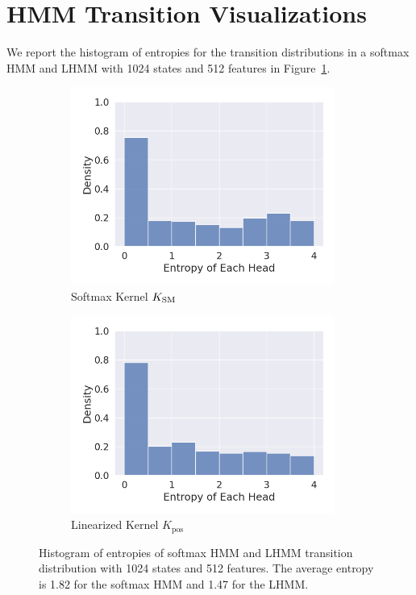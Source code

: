 \documentclass{article}
\begin{document}
\section{HMM Transition Visualizations}
We report the histogram of entropies for the transition distributions in a softmax HMM and LHMM with 1024 states and 512 features in Figure~\ref{fig:hmm_transition_histogram}.


\begin{figure}[!htp]
  \centering
  \begin{subfigure}[t]{0.45\textwidth}
  \centering
  \includegraphics[width=0.95\textwidth]{imgs/hmm/softmax-transition-entropy.png}
  \caption{Softmax Kernel $K_{\mathrm{SM}}$}
  \end{subfigure}
  \begin{subfigure}[t]{0.45\textwidth}
  \centering
  \includegraphics[width=0.95\textwidth]{imgs/hmm/smp-transition-entropy.png}
  \caption{Linearized Kernel $K_{\textrm{pos}}$}
  \end{subfigure}
  \caption{\label{fig:hmm_transition_histogram}Histogram of entropies of softmax HMM and LHMM transition distribution with 1024 states and 512 features. The average entropy is 1.82 for the softmax HMM and 1.47 for the LHMM.}
\end{figure}
\end{document}
